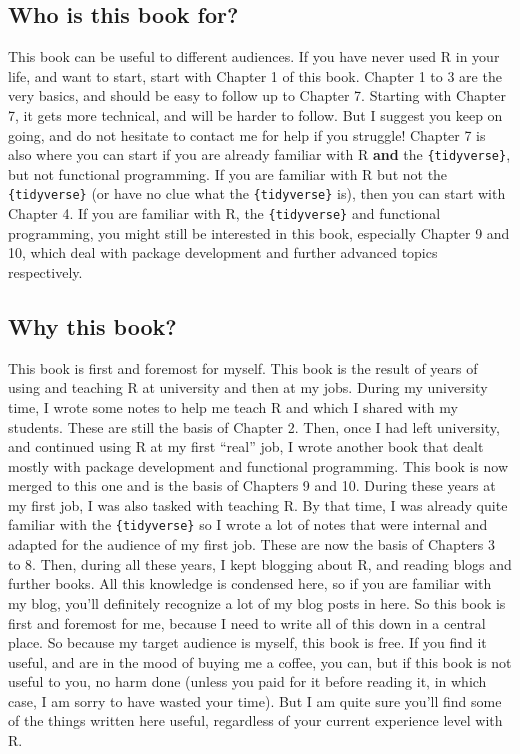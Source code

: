 \documentclass[
]{article}
\begin{document}
\hypertarget{who-is-this-book-for}{%
\subsection*{Who is this book for?}\label{who-is-this-book-for}}

This book can be useful to different audiences. If you have never used R in your life, and want
to start, start with Chapter 1 of this book. Chapter 1 to 3 are the very basics, and should be
easy to follow up to Chapter 7.
Starting with Chapter 7, it gets more technical, and will be harder to follow. But I suggest
you keep on going, and do not hesitate to contact me for help if you struggle! Chapter 7
is also where you can start if you are already familiar with R \textbf{and} the \texttt{\{tidyverse\}}, but not
functional programming. If you are familiar with R but not the \texttt{\{tidyverse\}} (or have no clue
what the \texttt{\{tidyverse\}} is), then you can start with Chapter 4. If you are familiar with R, the
\texttt{\{tidyverse\}} and functional programming, you might still be interested in this book, especially
Chapter 9 and 10, which deal with package development and further advanced topics respectively.

\hypertarget{why-this-book}{%
\subsection*{Why this book?}\label{why-this-book}}

This book is first and foremost for myself. This book is the result of years of using and teaching
R at university and then at my jobs. During my university time, I wrote some notes to help me
teach R and which I shared with my students. These are still the basis of Chapter 2. Then, once
I had left university, and continued using R at my first ``real'' job, I wrote another book that
dealt mostly with package development and functional programming. This book is now merged to this
one and is the basis of Chapters 9 and 10. During these years at my first
job, I was also tasked with teaching R. By that time, I was already quite familiar with the
\texttt{\{tidyverse\}} so I wrote a lot of notes that were internal and adapted for the audience of my
first job. These are now the basis of Chapters 3 to 8.
Then, during all these years, I kept blogging about R, and reading blogs and further books. All
this knowledge is condensed here, so if you are familiar with my blog, you'll definitely recognize
a lot of my blog posts in here. So this book is first and foremost for me, because I need to write
all of this down in a central place. So because my target audience is myself, this book is free. If
you find it useful, and are in the mood of buying me a coffee, you can, but if this book is not
useful to you, no harm done (unless you paid for it before reading it, in which case, I am sorry
to have wasted your time). But I am quite sure you'll find some of the things written here useful,
regardless of your current experience level with R.
\end{document}
